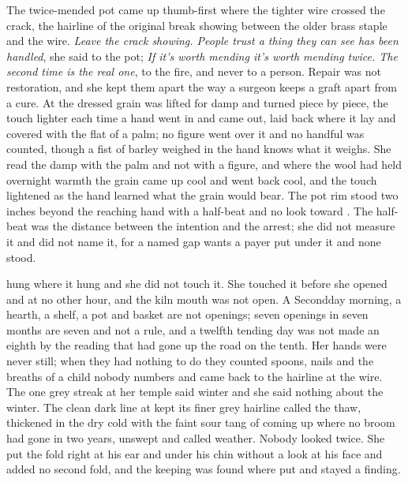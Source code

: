 The twice-mended pot came up thumb-first where the tighter wire crossed the crack, the hairline of the original break showing between the older brass staple and the wire. \emph{Leave the crack showing. People trust a thing they can see has been handled}, she said to the pot; \emph{If it's worth mending it's worth mending twice. The second time is the real one}, to the fire, and never to a person. Repair was not restoration, and she kept them apart the way a surgeon keeps a graft apart from a cure. At  the dressed grain was lifted for damp and turned piece by piece, the touch lighter each time a hand went in and came out, laid back where it lay and covered with the flat of a palm; no figure went over it and no handful was counted, though a fist of barley weighed in the hand knows what it weighs. She read the damp with the palm and not with a figure, and where the wool had held overnight warmth the grain came up cool and went back cool, and the touch lightened as the hand learned what the grain would bear. The pot rim stood two inches beyond the reaching hand with a half-beat and no look toward . The half-beat was the distance between the intention and the arrest; she did not measure it and did not name it, for a named gap wants a payer put under it and none stood.

 hung where it hung and she did not touch it. She touched it before she opened  and at no other hour, and the kiln mouth was not open. A Secondday morning, a hearth, a shelf, a pot and basket are not openings; seven openings in seven months are seven and not a rule, and a twelfth tending day was not made an eighth by the reading that had gone up the road on the tenth. Her hands were never still; when they had nothing to do they counted spoons, nails and the breaths of a child nobody numbers and came back to the hairline at the wire. The one grey streak at her temple said winter and she said nothing about the winter. The clean dark line at  kept its finer grey hairline called the thaw, thickened in the dry cold with the faint sour tang of  coming up where no broom had gone in two years, unswept and called weather. Nobody looked twice. She put the fold right at his ear and under his chin without a look at his face and added no second fold, and the keeping was found where put and stayed a finding.

\scenebreak

